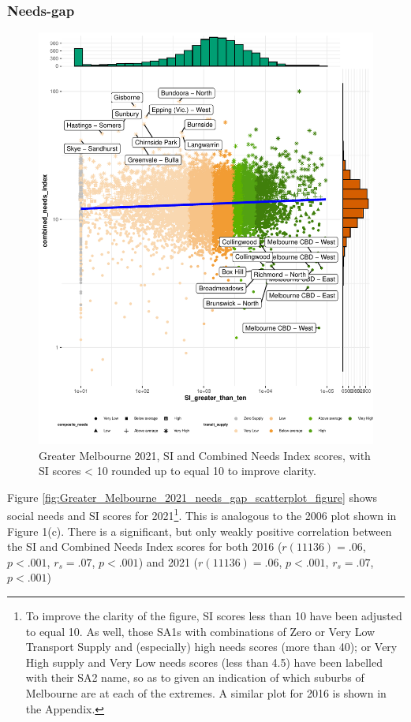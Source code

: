 \documentclass[preprint, 3p,
authoryear]{elsarticle} %
\begin{document}
\subsubsection{Needs-gap}\label{needs-gap}

\begin{figure}
\centering
\includegraphics{ReynoldsCurrieQu2024_files/figure-latex/Greater_Melbourne_2021_needs_gap_scatterplot_figure-1.pdf}
\caption{Greater Melbourne 2021, SI and Combined Needs Index scores,
with SI scores \textless{} 10 rounded up to equal 10 to improve
clarity.}
\end{figure}

Figure \ref{fig:Greater_Melbourne_2021_needs_gap_scatterplot_figure}
shows social needs and SI scores for 2021\footnote{To improve the
  clarity of the figure, SI scores less than 10 have been adjusted to
  equal 10. As well, those SA1s with combinations of Zero or Very Low
  Transport Supply and (especially) high needs scores (more than 40); or
  Very High supply and Very Low needs scores (less than 4.5) have been
  labelled with their SA2 name, so as to given an indication of which
  suburbs of Melbourne are at each of the extremes. A similar plot for
  2016 is shown in the Appendix.}. This is analogous to the 2006 plot
shown in Figure 1(c). There is a significant, but only weakly positive
correlation between the SI and Combined Needs Index scores for both 2016
(\(r(11136) = .06\), \(p < .001\), \(r_s =.07\), \(p < .001\)) and 2021
(\(r(11136) = .06\), \(p < .001\), \(r_s =.07\), \(p < .001\))
\end{document}
